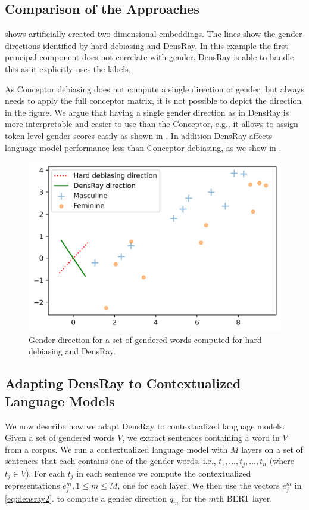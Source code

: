 \subsection{Comparison of the Approaches}
  shows artificially created two dimensional embeddings. The lines show the gender directions identified by hard debiasing and DensRay. In this example
 the first principal component does not correlate with gender. DensRay is able to handle this as it explicitly uses the labels.
 
As Conceptor debiasing does not compute a single direction of gender, but always needs to apply the full conceptor matrix, it is not possible to depict the direction in the figure. 
We argue that having a single gender direction as in DensRay is more interpretable and easier to use than the Conceptor, e.g., it allows  to assign token level gender scores easily as shown in . In addition DensRay affects language model performance less than Conceptor debiasing, as we show in .
\begin{figure}[h]
	\centering
	\includegraphics[width=0.4\linewidth]{examples.png}
	\caption{Gender direction for a set of gendered
          words computed for hard debiasing and DensRay.}
\end{figure}

\subsection{Adapting DensRay to Contextualized Language Models}
We now describe how we adapt DensRay to contextualized
language models. Given a set of gendered words
$V$, we extract sentences containing a word in $V$ from a
corpus. We run a contextualized language model
with $M$ layers
on a set of 
sentences that each contains one of the gender words, i.e., 
$t_1,\ldots,t_j,\ldots,t_n$ (where $t_j \in V$). 
For each $t_j $ in each sentence we  compute the contextualized representations $e_j^m, 1\leq m
\leq M$, one for each layer. We then use the vectors $e_j^m$ in \eqref{eq:densray2}.
to compute a gender direction
$q_m$ for the $m$th BERT layer. 
